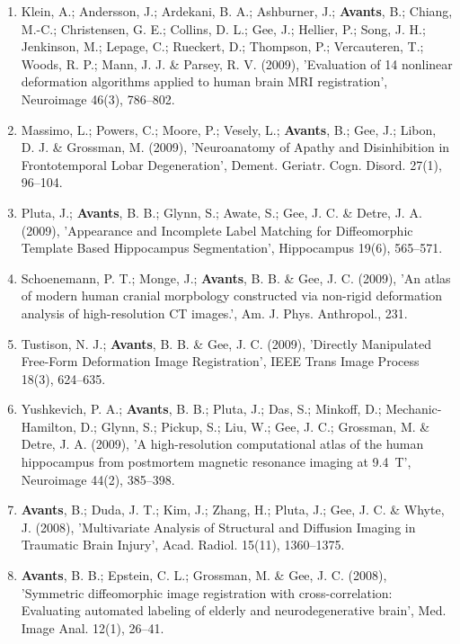 \documentclass[11pt]{moderncv} %
\begin{document}
\begin{enumerate}
\item  Klein, A.; Andersson, J.; Ardekani, B. A.; Ashburner, J.; \textbf{Avants}, B.; Chiang, M.-C.; Christensen, G. E.; Collins, D. L.; Gee, J.; Hellier, P.; Song, J. H.; Jenkinson, M.; Lepage, C.; Rueckert, D.; Thompson, P.; Vercauteren, T.; Woods, R. P.; Mann, J. J. \&  Parsey, R. V. (2009), 'Evaluation of 14 nonlinear deformation algorithms applied to human brain MRI registration', Neuroimage 46(3), 786--802.

\item  Massimo, L.; Powers, C.; Moore, P.; Vesely, L.; \textbf{Avants}, B.; Gee, J.; Libon, D. J. \&  Grossman, M. (2009), 'Neuroanatomy of Apathy and Disinhibition in Frontotemporal Lobar Degeneration', Dement. Geriatr. Cogn. Disord. 27(1), 96--104.

\item  Pluta, J.; \textbf{Avants}, B. B.; Glynn, S.; Awate, S.; Gee, J. C. \&  Detre, J. A. (2009), 'Appearance and Incomplete Label Matching for Diffeomorphic Template Based Hippocampus Segmentation', Hippocampus 19(6), 565--571.

\item  Schoenemann, P. T.; Monge, J.; \textbf{Avants}, B. B. \&  Gee, J. C. (2009), 'An atlas of modern human cranial morpbology constructed via non-rigid deformation analysis of high-resolution CT images.', Am. J. Phys. Anthropol., 231.

\item  Tustison, N. J.; \textbf{Avants}, B. B. \&  Gee, J. C. (2009), 'Directly Manipulated Free-Form Deformation Image Registration', IEEE Trans Image Process 18(3), 624--635.

\item  Yushkevich, P. A.; \textbf{Avants}, B. B.; Pluta, J.; Das, S.; Minkoff, D.; Mechanic-Hamilton, D.; Glynn, S.; Pickup, S.; Liu, W.; Gee, J. C.; Grossman, M. \&  Detre, J. A. (2009), 'A high-resolution computational atlas of the human hippocampus from postmortem magnetic resonance imaging at 9.4~T', Neuroimage 44(2), 385--398.

\item  \textbf{Avants}, B.; Duda, J. T.; Kim, J.; Zhang, H.; Pluta, J.; Gee, J. C. \&  Whyte, J. (2008), 'Multivariate Analysis of Structural and Diffusion Imaging in Traumatic Brain Injury', Acad. Radiol. 15(11), 1360--1375.

\item  \textbf{Avants}, B. B.; Epstein, C. L.; Grossman, M. \&  Gee, J. C. (2008), 'Symmetric diffeomorphic image registration with cross-correlation: Evaluating automated labeling of elderly and neurodegenerative brain', Med. Image Anal. 12(1), 26--41.


\end{enumerate}
\end{document}
